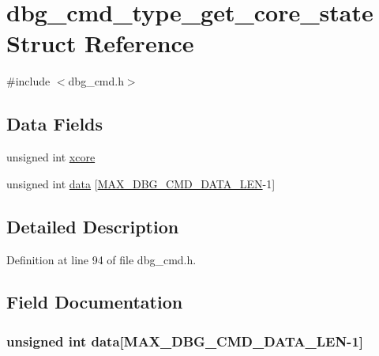 \hypertarget{structdbg__cmd__type__get__core__state}{\section{dbg\-\_\-cmd\-\_\-type\-\_\-get\-\_\-core\-\_\-state Struct Reference}
\label{structdbg__cmd__type__get__core__state}
}


{\ttfamily \#include $<$dbg\-\_\-cmd.\-h$>$}

\subsection*{Data Fields}
\begin{DoxyCompactItemize}
\item 
unsigned int \hyperlink{structdbg__cmd__type__get__core__state_a78357326dd562d441c3c73f5676ac638}{xcore}
\item 
unsigned int \hyperlink{structdbg__cmd__type__get__core__state_abceed6826af53b88f4cc936fac1716f0}{data} \mbox{[}\hyperlink{dbg__cmd_8h_a4552ec15033c8a68870cdf80eda5470c}{M\-A\-X\-\_\-\-D\-B\-G\-\_\-\-C\-M\-D\-\_\-\-D\-A\-T\-A\-\_\-\-L\-E\-N}-\/1\mbox{]}
\end{DoxyCompactItemize}


\subsection{Detailed Description}


Definition at line 94 of file dbg\-\_\-cmd.\-h.



\subsection{Field Documentation}
\hypertarget{structdbg__cmd__type__get__core__state_abceed6826af53b88f4cc936fac1716f0}{
\subsubsection[{data}]{\setlength{\rightskip}{0pt plus 5cm}unsigned int data\mbox{[}{\bf M\-A\-X\-\_\-\-D\-B\-G\-\_\-\-C\-M\-D\-\_\-\-D\-A\-T\-A\-\_\-\-L\-E\-N}-\/1\mbox{]}}}\label{structdbg__cmd__type__get__core__state_abceed6826af53b88f4cc936fac1716f0}


